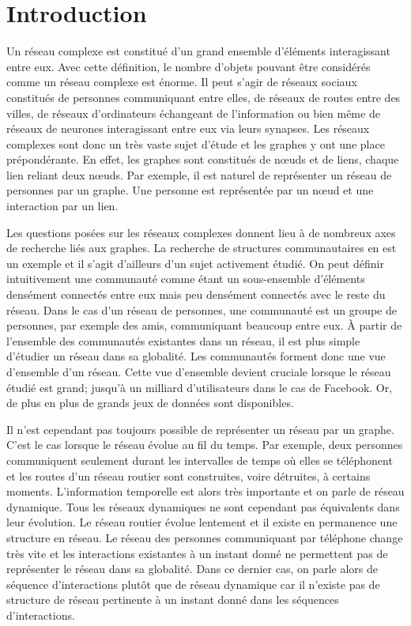 
\chapter*{Introduction}

Un réseau complexe est constitué d'un grand ensemble d'éléments interagissant entre eux.
Avec cette définition, le nombre d'objets pouvant être considérés comme un réseau complexe est énorme.
Il peut s'agir de réseaux sociaux constitués de personnes communiquant entre elles, de réseaux de routes entre des villes, de réseaux d'ordinateurs échangeant de l'information ou bien même de réseaux de neurones interagissant entre eux via leurs synapses.
Les réseaux complexes sont donc un très vaste sujet d'étude et les graphes y ont une place prépondérante.
En effet, les graphes sont constitués de n\oe{}uds et de liens, chaque lien reliant deux n\oe{}uds.
Par exemple, il est naturel de représenter un réseau de personnes par un graphe. Une personne est représentée par un n\oe{}ud et une interaction par un lien.

Les questions posées sur les réseaux complexes donnent lieu à de nombreux axes de recherche liés aux graphes.
La recherche de structures communautaires en est un exemple et il s'agit d'ailleurs d'un sujet activement étudié.
On peut définir intuitivement une communauté comme étant un sous-ensemble d’éléments densément connectés entre eux mais peu densément connectés avec le reste du réseau.
Dans le cas d'un réseau de personnes, une communauté est un groupe de personnes, par exemple des amis, communiquant beaucoup entre eux.
\`A partir de l'ensemble des communautés existantes dans un réseau, il est plus simple d'étudier un réseau dans sa globalité.
Les communautés forment donc une vue d'ensemble d'un réseau.
Cette vue d'ensemble devient cruciale lorsque le réseau étudié est grand; jusqu'à un milliard d'utilisateurs dans le cas de Facebook.
Or, de plus en plus de grands jeux de données sont disponibles.


Il n'est cependant pas toujours possible de représenter un réseau par un graphe.
C'est le cas lorsque le réseau évolue au fil du temps.
Par exemple, deux personnes communiquent seulement durant les intervalles de temps où elles se téléphonent et les routes d'un réseau routier sont construites, voire détruites, à certains moments.
L'information temporelle est alors très importante et on parle de réseau dynamique.
Tous les réseaux dynamiques ne sont cependant pas équivalents dans leur évolution.
Le réseau routier évolue lentement et il existe en permanence une structure en réseau.
Le réseau des personnes communiquant par téléphone change très vite et les interactions existantes à un instant donné ne permettent pas de représenter le réseau dans sa globalité.
Dans ce dernier cas, on parle alors de séquence d'interactions plutôt que de réseau dynamique car il n'existe pas de structure de réseau pertinente à un instant donné dans les séquences d'interactions.


